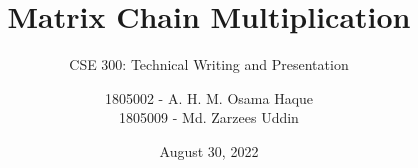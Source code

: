 \title{Matrix Chain Multiplication}
\subtitle{CSE 300: Technical Writing and Presentation}
\date{August 30, 2022}
\author{1805002 - A. H. M. Osama Haque\\ 1805009 -  Md. Zarzees Uddin}
